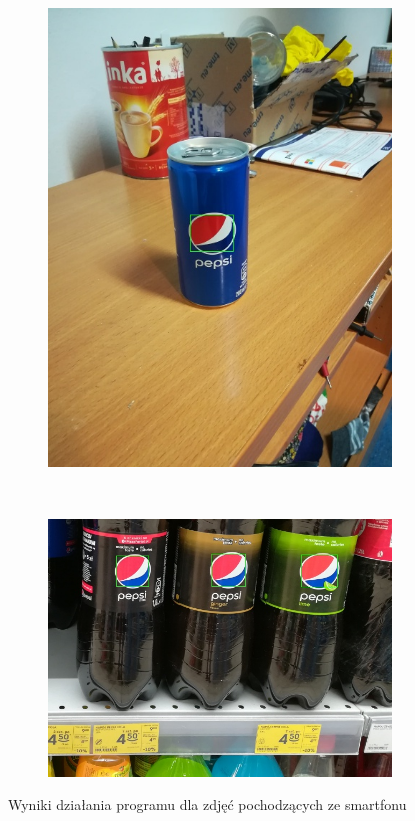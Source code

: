 \documentclass[11pt,a4paper,twoside]{report}
\begin{document}
\begin{figure}
\begin{subfigure}[b]{0.48\textwidth}
	        \includegraphics[width=\textwidth]{img/camera/1}
	    \end{subfigure}
	    \\
	    \begin{subfigure}[b]{\textwidth}
	        \includegraphics[width=\textwidth]{img/camera/9}
	    \end{subfigure}
	    \caption{Wyniki działania programu dla zdjęć pochodzących ze smartfonu}
	    \label{fig:smartfon-1}
	\end{figure}
\end{document}
